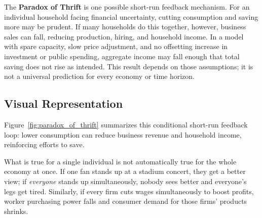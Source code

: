 \documentclass[11pt,letterpaper]{article}
\begin{document}
The \textbf{Paradox of Thrift} is one possible short-run feedback mechanism. For an individual household facing financial uncertainty, cutting consumption and saving more may be prudent. If many households do this together, however, business sales can fall, reducing production, hiring, and household income. In a model with spare capacity, slow price adjustment, and no offsetting increase in investment or public spending, aggregate income may fall enough that total saving does not rise as intended. This result depends on those assumptions; it is not a universal prediction for every economy or time horizon.

\subsection*{Visual Representation}
Figure~\ref{fig:paradox_of_thrift} summarizes this conditional short-run feedback loop: lower consumption can reduce business revenue and household income, reinforcing efforts to save.

\begin{tcolorbox}[colback=LightTerracotta,colframe=CourseOrange,title=\textbf{Clear It Up: Fallacy of Composition in Macroeconomics}]
What is true for a single individual is not automatically true for the whole economy at once. If one fan stands up at a stadium concert, they get a better view; if \emph{everyone} stands up simultaneously, nobody sees better and everyone's legs get tired. Similarly, if every firm cuts wages simultaneously to boost profits, worker purchasing power falls and consumer demand for those firms' products shrinks.
\end{tcolorbox}
\end{document}
